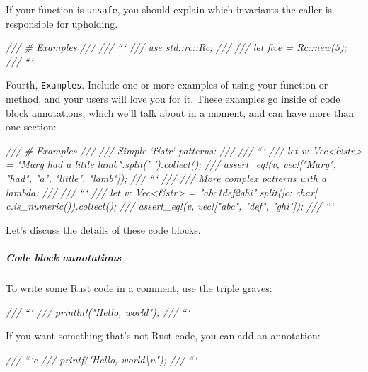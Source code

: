 \documentclass[a4paper,]{book}
\newenvironment{Shaded}{\begin{snugshade}}{\end{snugshade}}
\newcommand{\CommentTok}[1]{\textcolor[rgb]{0.56,0.35,0.01}{\textit{{#1}}}}
\let\oldsubparagraph\subparagraph
\renewcommand{\subparagraph}[1]{\oldsubparagraph{#1}\mbox{}}
\begin{document}
If your function is \texttt{unsafe}, you should explain which invariants
the caller is responsible for upholding.

\begin{Shaded}
\begin{Highlighting}[]
\CommentTok{/// # Examples}
\CommentTok{///}
\CommentTok{/// ```}
\CommentTok{/// use std::rc::Rc;}
\CommentTok{///}
\CommentTok{/// let five = Rc::new(5);}
\CommentTok{/// ```}
\end{Highlighting}
\end{Shaded}

Fourth, \texttt{Examples}. Include one or more examples of using your
function or method, and your users will love you for it. These examples
go inside of code block annotations, which we'll talk about in a moment,
and can have more than one section:

\begin{Shaded}
\begin{Highlighting}[]
\CommentTok{/// # Examples}
\CommentTok{///}
\CommentTok{/// Simple `&str` patterns:}
\CommentTok{///}
\CommentTok{/// ```}
\CommentTok{/// let v: Vec<&str> = "Mary had a little lamb".split(' ').collect();}
\CommentTok{/// assert_eq!(v, vec!["Mary", "had", "a", "little", "lamb"]);}
\CommentTok{/// ```}
\CommentTok{///}
\CommentTok{/// More complex patterns with a lambda:}
\CommentTok{///}
\CommentTok{/// ```}
\CommentTok{/// let v: Vec<&str> = "abc1def2ghi".split(|c: char| c.is_numeric()).collect();}
\CommentTok{/// assert_eq!(v, vec!["abc", "def", "ghi"]);}
\CommentTok{/// ```}
\end{Highlighting}
\end{Shaded}

Let's discuss the details of these code blocks.

\subparagraph{Code block annotations}\label{code-block-annotations}

To write some Rust code in a comment, use the triple graves:

\begin{Shaded}
\begin{Highlighting}[]
\CommentTok{/// ```}
\CommentTok{/// println!("Hello, world");}
\CommentTok{/// ```}
\end{Highlighting}
\end{Shaded}

If you want something that's not Rust code, you can add an annotation:

\begin{Shaded}
\begin{Highlighting}[]
\CommentTok{/// ```c}
\CommentTok{/// printf("Hello, world\textbackslash{}n");}
\CommentTok{/// ```}
\end{Highlighting}
\end{Shaded}
\end{document}
